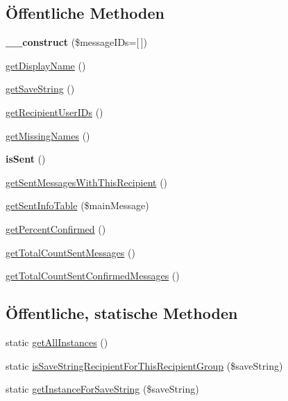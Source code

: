 \subsection*{Öffentliche Methoden}
\begin{DoxyCompactItemize}
\item 
\mbox{\label{class_message_recipient_abe2dbb08ba4dda9c79c574dd44ee553e}} 
{\bfseries \+\_\+\+\_\+construct} (\$message\+I\+Ds=\mbox{[}$\,$\mbox{]})
\item 
\mbox{\hyperlink{class_message_recipient_a065ec30c3693ce595b8b1cd2a729ea68}{get\+Display\+Name}} ()
\item 
\mbox{\hyperlink{class_message_recipient_abe6c45dd132b1182089eb936f8034d02}{get\+Save\+String}} ()
\item 
\mbox{\hyperlink{class_message_recipient_a4e2b6cab31e815a8e894ae5a860887a0}{get\+Recipient\+User\+I\+Ds}} ()
\item 
\mbox{\hyperlink{class_message_recipient_a6222eaf2087b16cd705a811998bea076}{get\+Missing\+Names}} ()
\item 
\mbox{\label{class_message_recipient_aa875e7aa4b16c512b97ee816ba8cbaa6}} 
{\bfseries is\+Sent} ()
\item 
\mbox{\hyperlink{class_message_recipient_a68aea67ca0874a045bdfbcfc5a62ffb1}{get\+Sent\+Messages\+With\+This\+Recipient}} ()
\item 
\mbox{\hyperlink{class_message_recipient_a02af7aa2d9bedac2cc7911ae886c6eb6}{get\+Sent\+Info\+Table}} (\$main\+Message)
\item 
\mbox{\hyperlink{class_message_recipient_a1762af3cbc0d04dd81eae942f8fc0172}{get\+Percent\+Confirmed}} ()
\item 
\mbox{\hyperlink{class_message_recipient_ac9dce37505bc22950687cc62f28e69cb}{get\+Total\+Count\+Sent\+Messages}} ()
\item 
\mbox{\hyperlink{class_message_recipient_a817d8fbe382a7cde13468f380a29fa07}{get\+Total\+Count\+Sent\+Confirmed\+Messages}} ()
\end{DoxyCompactItemize}
\subsection*{Öffentliche, statische Methoden}
\begin{DoxyCompactItemize}
\item 
static \mbox{\hyperlink{class_message_recipient_a97bf719f14b23c67217a57bc448ac782}{get\+All\+Instances}} ()
\item 
static \mbox{\hyperlink{class_message_recipient_ad2319ccbb714795150888063e729f728}{is\+Save\+String\+Recipient\+For\+This\+Recipient\+Group}} (\$save\+String)
\item 
static \mbox{\hyperlink{class_message_recipient_a60a3f2e316b8469fd5a0a85f1090bce1}{get\+Instance\+For\+Save\+String}} (\$save\+String)
\end{DoxyCompactItemize}
